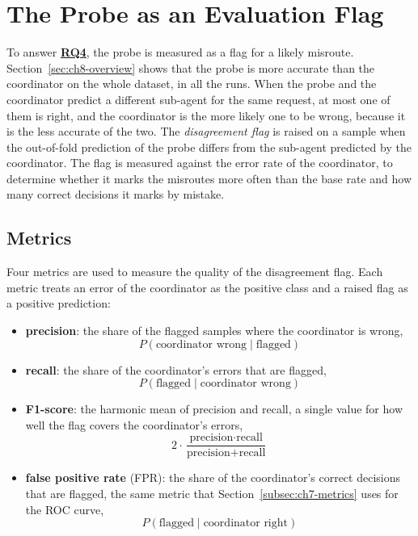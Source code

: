\section{The Probe as an Evaluation Flag}
\label{sec:ch8-error-flag}

\label{rq:ch8-rq4-intro}


\noindent To answer \hyperref[rq:ch8-rq4-intro]{\textbf{RQ4}}, the probe is measured as a flag for a likely misroute. Section~\ref{sec:ch8-overview} shows that the probe is more accurate than the coordinator on the whole dataset, in all the runs. When the probe and the coordinator predict a different sub-agent for the same request, at most one of them is right, and the coordinator is the more likely one to be wrong, because it is the less accurate of the two. The \emph{disagreement flag} is raised on a sample when the out-of-fold prediction of the probe differs from the sub-agent predicted by the coordinator. The flag is measured against the error rate of the coordinator, to determine whether it marks the misroutes more often than the base rate and how many correct decisions it marks by mistake.

\subsection{Metrics}
\label{subsec:ch8-error-flag-metrics}

Four metrics are used to measure the quality of the disagreement flag. Each metric treats an error of the coordinator as the positive class and a raised flag as a positive prediction:

\begin{itemize}
    \item \textbf{precision}: the share of the flagged samples where the coordinator is wrong,
    \[
        P(\text{coordinator wrong} \mid \text{flagged})
    \]
    \item \textbf{recall}: the share of the coordinator's errors that are flagged,
    \[
        P(\text{flagged} \mid \text{coordinator wrong})
    \]
    \item \textbf{F1-score}: the harmonic mean of precision and recall, a single value for how well the flag covers the coordinator's errors,
    \[
        2 \cdot \frac{\text{precision} \cdot \text{recall}}{\text{precision} + \text{recall}}
    \]
    \item \textbf{false positive rate} (FPR): the share of the coordinator's correct decisions that are flagged, the same metric that Section~\ref{subsec:ch7-metrics} uses for the ROC curve,
    \[
        P(\text{flagged} \mid \text{coordinator right})
    \]
\end{itemize}

